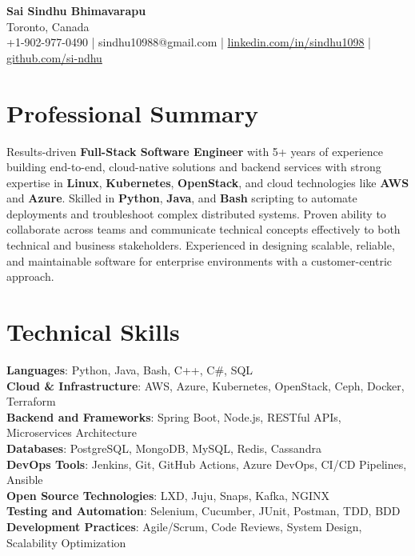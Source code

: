 \documentclass[letterpaper,11pt]{article}
\begin{document}
\begin{center}
  {\Large \textbf{Sai Sindhu Bhimavarapu}} \\
  Toronto, Canada \\
  +1-902-977-0490 \enspace | \enspace sindhu10988@gmail.com \enspace | \enspace \href{https://www.linkedin.com/in/sindhu1098/}{linkedin.com/in/sindhu1098} \enspace | \enspace \href{https://github.com/si-ndhu}{github.com/si-ndhu}
\end{center}

\section{Professional Summary}
  \begin{itemize}[leftmargin=0.15in, label={}]
    \small{\item{
     Results-driven \textbf{Full-Stack Software Engineer} with 5+ years of experience building end-to-end, cloud-native solutions and backend services with strong expertise in \textbf{Linux}, \textbf{Kubernetes}, \textbf{OpenStack}, and cloud technologies like \textbf{AWS} and \textbf{Azure}. Skilled in \textbf{Python}, \textbf{Java}, and \textbf{Bash} scripting to automate deployments and troubleshoot complex distributed systems. Proven ability to collaborate across teams and communicate technical concepts effectively to both technical and business stakeholders. Experienced in designing scalable, reliable, and maintainable software for enterprise environments with a customer-centric approach.
    }}
  \end{itemize}
\vspace{-16pt}

\section{Technical Skills}
 \begin{itemize}[leftmargin=0.15in, label={}]
    \small{\item{
     \textbf{Languages}: Python, Java, Bash, C++, C\#, SQL \\
     \textbf{Cloud \& Infrastructure}: AWS, Azure, Kubernetes, OpenStack, Ceph, Docker, Terraform \\
     \textbf{Backend and Frameworks}: Spring Boot, Node.js, RESTful APIs, Microservices Architecture \\
     \textbf{Databases}: PostgreSQL, MongoDB, MySQL, Redis, Cassandra \\
     \textbf{DevOps Tools}: Jenkins, Git, GitHub Actions, Azure DevOps, CI/CD Pipelines, Ansible \\
     \textbf{Open Source Technologies}: LXD, Juju, Snaps, Kafka, NGINX \\
     \textbf{Testing and Automation}: Selenium, Cucumber, JUnit, Postman, TDD, BDD \\
     \textbf{Development Practices}: Agile/Scrum, Code Reviews, System Design, Scalability Optimization
    }}
 \end{itemize}
\vspace{-16pt}
\end{document}
